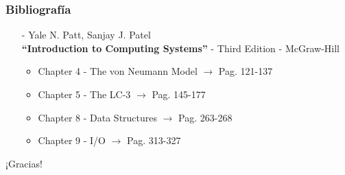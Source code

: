 \documentclass[aspectratio=169]{beamer}
\begin{document}
\begin{frame}[fragile]
    \frametitle{Bibliografía}
    \begin{itemize}
    \setlength\itemsep{0.0cm}
    \item[-] \small Yale N. Patt, Sanjay J. Patel\\
    \textbf{``Introduction to Computing Systems''} - Third Edition - McGraw-Hill\\
    \begin{itemize}
    \item Chapter 4 - The von Neumann Model $\rightarrow$ Pag. 121-137
    \item Chapter 5 - The LC-3 $\rightarrow$ Pag. 145-177
    \item Chapter 8 - Data Structures $\rightarrow$ Pag. 263-268
    \item Chapter 9 - I/O $\rightarrow$ Pag. 313-327
    \end{itemize}
    \end{itemize}
\end{frame}

\begin{frame}[plain]
    \begin{center}
    \vspace{2cm}
    \huge ¡Gracias!\\
    \vspace{2cm}
    \end{center}
\end{frame}
\end{document}
